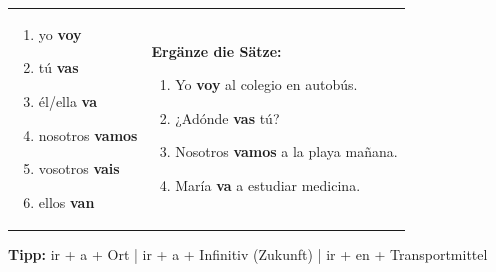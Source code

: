 \documentclass[11pt, a4paper]{article}
\newcommand{\lsg}[1]{\textcolor{loesung}{\textbf{#1}}}
\begin{document}
\vspace{0.3cm}


\begin{tcolorbox}[
    colback=hellgrau,
    colframe=spanisch,
    title={\color{white}\bfseries Aufgabe 2: Conjuga el verbo IR},
    fonttitle=\bfseries
]

\begin{tabular}{@{}p{6cm}p{10cm}@{}}
\begin{enumerate}[label=\alph*)]
    \item yo \lsg{voy}
    \item tú \lsg{vas}
    \item él/ella \lsg{va}
    \item nosotros \lsg{vamos}
    \item vosotros \lsg{vais}
    \item ellos \lsg{van}
\end{enumerate}
&
\textbf{Ergänze die Sätze:}
\begin{enumerate}[label=\alph*), start=7]
    \item Yo \lsg{voy} al colegio en autobús.
    \item ¿Adónde \lsg{vas} tú?
    \item Nosotros \lsg{vamos} a la playa mañana.
    \item María \lsg{va} a estudiar medicina.
\end{enumerate}
\end{tabular}

\vspace{0.2cm}
\footnotesize\textbf{Tipp:} ir + a + Ort | ir + a + Infinitiv (Zukunft) | ir + en + Transportmittel
\end{tcolorbox}

\vspace{0.3cm}

\end{document}
